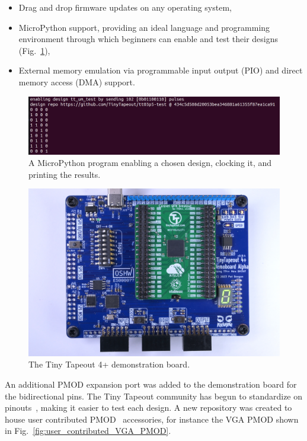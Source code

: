 \begin{itemize}
\item Drag and drop firmware updates on any operating system,
\item MicroPython\cite{micropython} support, providing an ideal language and programming environment through which beginners can enable and test their designs (Fig.~\ref{fig:micropython_program}),
\item External memory emulation via programmable input output (PIO) and direct memory access (DMA) support.
\end{itemize}

\begin{figure}[!t]
\centering
\includegraphics[width=\columnwidth]{./Figs/tt3p5 enable design.png}
\caption{A MicroPython program\cite{demofirmwaretest} enabling a chosen design, clocking it, and printing the results.}
\label{fig:micropython_program}
\end{figure}

\begin{figure}[!t]
\centering
\includegraphics[width=\columnwidth]{./Figs/tt04-demoboard-top.jpg}
\caption{The Tiny Tapeout 4+ demonstration board\cite{tt04demoboard}.}
\label{fig:TT04plus_demo_board}
\end{figure}

An additional PMOD expansion port was added to the demonstration board for the bidirectional pins. The Tiny Tapeout community has begun to standardize on pinouts~\cite{pinouts}, making it easier to test each design.
A new repository was created to house user contributed PMOD~\cite{awesomepmods} accessories, for instance the VGA PMOD shown in Fig.~\ref{fig:user_contributed_VGA_PMOD}.

